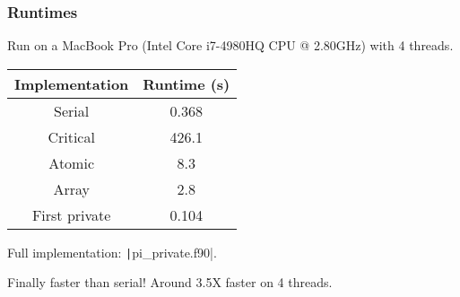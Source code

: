 \documentclass{beamer}
\begin{document}
\begin{frame}
\frametitle{Runtimes}
Run on a MacBook Pro (Intel Core i7-4980HQ CPU @ 2.80GHz) with 4 threads.

\vfill

\begin{table}
\begin{tabular}{cc}
\toprule
Implementation & Runtime (s) \\
\midrule
Serial        & 0.368 \\
Critical      & 426.1 \\
Atomic        & 8.3 \\
Array         & 2.8 \\
First private & 0.104 \\
\bottomrule
\end{tabular}
\end{table}

Full implementation: \texttt|pi_private.f90|.

\begin{center}
\large Finally faster than serial! Around 3.5X faster on 4 threads.
\end{center}

\end{frame}

\end{document}
